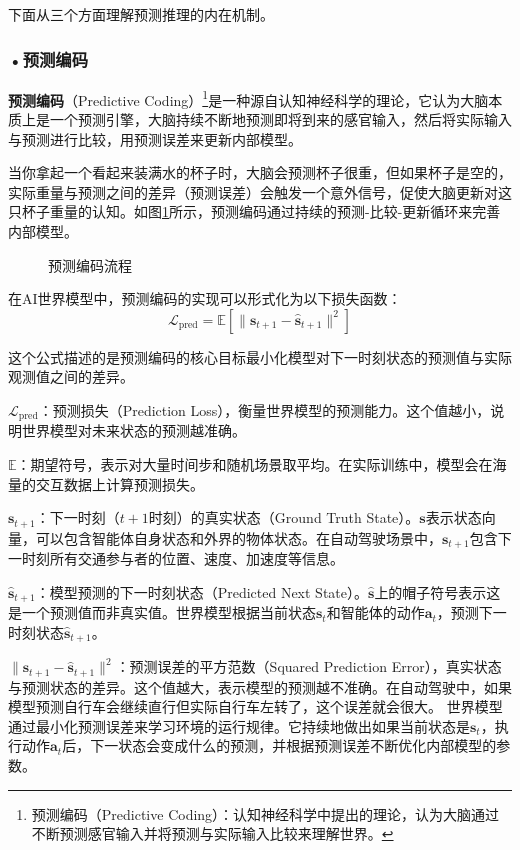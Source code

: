 下面从三个方面理解预测推理的内在机制。

\subsubsection*{\textbf{•预测编码}}

\textbf{预测编码}（Predictive Coding）\footnote{预测编码（Predictive Coding）：认知神经科学中提出的理论，认为大脑通过不断预测感官输入并将预测与实际输入比较来理解世界。}是一种源自认知神经科学的理论，它认为大脑本质上是一个预测引擎，大脑持续不断地预测即将到来的感官输入，然后将实际输入与预测进行比较，用预测误差来更新内部模型。

当你拿起一个看起来装满水的杯子时，大脑会预测杯子很重，但如果杯子是空的，实际重量与预测之间的差异（预测误差）会触发一个意外信号，促使大脑更新对这只杯子重量的认知。如图\ref{fig:ch2_2_36}所示，预测编码通过持续的预测-比较-更新循环来完善内部模型。

\begin{figure}[H]
\centering
{}
\caption{预测编码流程}
\label{fig:ch2_2_36}
\end{figure}


在AI世界模型中，预测编码的实现可以形式化为以下损失函数：
\[
\mathcal{L}_{\text{pred}} = \mathbb{E}\left[ \| \mathbf{s}_{t+1} - \hat{\mathbf{s}}_{t+1} \|^2 \right]
\]

这个公式描述的是预测编码的核心目标最小化模型对下一时刻状态的预测值与实际观测值之间的差异。

$\mathcal{L}_{\text{pred}}$：预测损失（Prediction Loss），衡量世界模型的预测能力。这个值越小，说明世界模型对未来状态的预测越准确。

$\mathbb{E}$：期望符号，表示对大量时间步和随机场景取平均。在实际训练中，模型会在海量的交互数据上计算预测损失。

$\mathbf{s}_{t+1}$：下一时刻（$t+1$时刻）的真实状态（Ground Truth State）。$\mathbf{s}$表示状态向量，可以包含智能体自身状态和外界的物体状态。在自动驾驶场景中，$\mathbf{s}_{t+1}$包含下一时刻所有交通参与者的位置、速度、加速度等信息。

$\hat{\mathbf{s}}_{t+1}$：模型预测的下一时刻状态（Predicted Next State）。$\hat{\mathbf{s}}$上的帽子符号表示这是一个预测值而非真实值。世界模型根据当前状态$\mathbf{s}_t$和智能体的动作$\mathbf{a}_t$，预测下一时刻状态$\hat{\mathbf{s}}_{t+1}$。

$\| \mathbf{s}_{t+1} - \hat{\mathbf{s}}_{t+1} \|^2$：预测误差的平方范数（Squared Prediction Error），真实状态与预测状态的差异。这个值越大，表示模型的预测越不准确。在自动驾驶中，如果模型预测自行车会继续直行但实际自行车左转了，这个误差就会很大。
世界模型通过最小化预测误差来学习环境的运行规律。它持续地做出如果当前状态是$\mathbf{s}_t$，执行动作$\mathbf{a}_t$后，下一状态会变成什么的预测，并根据预测误差不断优化内部模型的参数。

